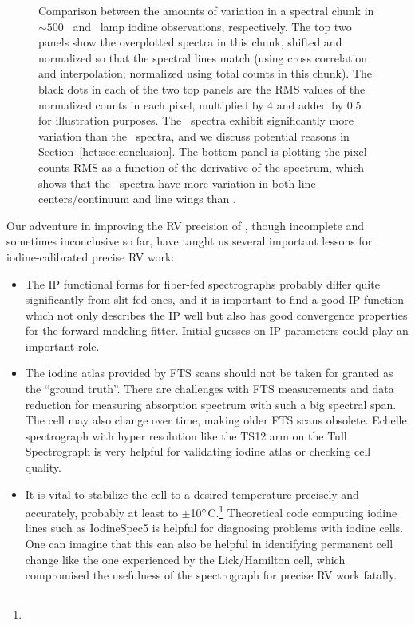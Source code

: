 \begin{figure}
\caption{Comparison between the amounts of variation in a spectral
chunk in $\sim 500$ \het\ and \keck\ lamp iodine observations,
respectively. The top two panels show the overplotted spectra in this
chunk, shifted and normalized so that the spectral lines match (using
cross correlation and interpolation; normalized using total counts in
this chunk). The black dots in each of the two top panels are the RMS
values of the normalized counts in each pixel, multiplied by 4 and
added by 0.5 for illustration purposes. The \het\ spectra exhibit
significantly more variation than the \keck\ spectra, and we discuss
potential reasons in Section~\ref{het:sec:conclusion}. The bottom
panel is plotting the pixel counts RMS as a function of the derivative
of the spectrum, which shows that the \het\ spectra have more
variation in both line centers/continuum and line wings than \keck.
\label{het:fig:chunkvary}}
\end{figure}

Our adventure in improving the RV precision of \het, though incomplete
and sometimes inconclusive so far, have taught us several important
lessons for iodine-calibrated precise RV work:

\begin{itemize}
  \item The IP functional forms for fiber-fed spectrographs probably
    differ quite significantly from slit-fed ones, and it is important
    to find a good IP function which not only describes the IP well
    but also has good convergence properties for the forward modeling
    fitter. Initial guesses on IP parameters could play an important
    role.
  \item The iodine atlas provided by FTS scans should not be taken for
    granted as the ``ground truth''. There are challenges with FTS
    measurements and data reduction for measuring absorption spectrum
    with such a big spectral span. The cell may also change over time,
    making older FTS scans obsolete. Echelle spectrograph with hyper
    resolution like the TS12 arm on the Tull Spectrograph is very
    helpful for validating iodine atlas or checking cell quality.
  \item It is vital to stabilize the cell to a desired temperature
    precisely and accurately, probably at least to
    $\pm$10$^{\circ}$C.\footnote{}
    Theoretical code computing iodine lines such as IodineSpec5 is
    helpful for diagnosing problems with iodine cells. One can imagine
    that this can also be helpful in identifying permanent cell change
    like the one experienced by the Lick/Hamilton cell, which
    compromised the usefulness of the spectrograph for precise RV work
    fatally\citep{2014ApJS..210....5F}.
\end{itemize}

